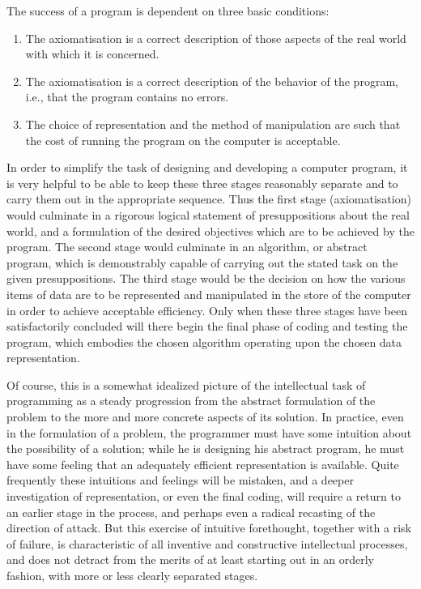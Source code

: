 The success of a program is dependent on three basic conditions:

\begin{enumerate}[leftmargin=2\parindent, label=(\arabic*)]
	\item The axiomatisation is a correct description of those aspects of the real world with which it is concerned.
	\item The axiomatisation is a correct description of the behavior of the program, i.e., that the program contains no errors.
	\item The choice of representation and the method of manipulation are such that the cost of running the program on the computer is acceptable.
\end{enumerate}

In order to simplify the task of designing and developing a computer program, it is very helpful to be able to keep these three stages reasonably separate and to carry them out in the appropriate sequence. Thus the first stage (axiomatisation) would culminate in a rigorous logical statement of presuppositions about the real world, and a formulation of the desired objectives which are to be achieved by the program. The second stage would culminate in an algorithm, or abstract program, which is demonstrably capable of carrying out the stated task on the given presuppositions. The third stage would be the decision on how the various items of data are to be represented and manipulated in the store of the computer in order to achieve acceptable efficiency. Only when these three stages have been satisfactorily concluded will there begin the final phase of coding and testing the program, which embodies the chosen algorithm operating upon the chosen data representation.

Of course, this is a somewhat idealized picture of the intellectual task of programming as a steady progression from the abstract formulation of the problem to the more and more concrete aspects of its solution. In practice, even in the formulation of a problem, the programmer must have some intuition about the possibility of a solution; while he is designing his abstract program, he must have some feeling that an adequately efficient representation is available. Quite frequently these intuitions and feelings will be mistaken,
and a deeper investigation of representation, or even the final coding, will require a return to an earlier stage in the process, and perhaps even a radical recasting of the direction of attack. But this exercise of intuitive forethought, together with a risk of failure, is characteristic of all inventive and constructive intellectual processes, and does not detract from the merits of at least starting out in an orderly fashion, with more or less clearly separated stages.

